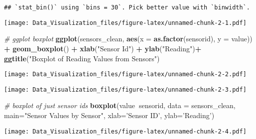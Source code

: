 \documentclass[]{article}
\newenvironment{Shaded}{\begin{snugshade}}{\end{snugshade}}
\newcommand{\CommentTok}[1]{\textcolor[rgb]{0.56,0.35,0.01}{\textit{#1}}}
\newcommand{\DataTypeTok}[1]{\textcolor[rgb]{0.13,0.29,0.53}{#1}}
\newcommand{\KeywordTok}[1]{\textcolor[rgb]{0.13,0.29,0.53}{\textbf{#1}}}
\newcommand{\NormalTok}[1]{#1}
\newcommand{\OperatorTok}[1]{\textcolor[rgb]{0.81,0.36,0.00}{\textbf{#1}}}
\newcommand{\StringTok}[1]{\textcolor[rgb]{0.31,0.60,0.02}{#1}}
\begin{document}
\begin{verbatim}
## `stat_bin()` using `bins = 30`. Pick better value with `binwidth`.
\end{verbatim}

\texttt{[image: Data\_Visualization\_files/figure-latex/unnamed-chunk-2-1.pdf]}

\begin{Shaded}
\begin{Highlighting}[]
\CommentTok{# ggplot boxplot}
\KeywordTok{ggplot}\NormalTok{(sensors_clean, }\KeywordTok{aes}\NormalTok{(}\DataTypeTok{x =} \KeywordTok{as.factor}\NormalTok{(sensorid), }\DataTypeTok{y =}\NormalTok{ value)) }\OperatorTok{+}\StringTok{ }\KeywordTok{geom_boxplot}\NormalTok{() }\OperatorTok{+}
\StringTok{  }\KeywordTok{xlab}\NormalTok{(}\StringTok{"Sensor Id"}\NormalTok{) }\OperatorTok{+}\StringTok{ }\KeywordTok{ylab}\NormalTok{(}\StringTok{"Reading"}\NormalTok{)}\OperatorTok{+}\StringTok{ }\KeywordTok{ggtitle}\NormalTok{(}\StringTok{"Boxplot of Reading Values from Sensors"}\NormalTok{)}
\end{Highlighting}
\end{Shaded}

\texttt{[image: Data\_Visualization\_files/figure-latex/unnamed-chunk-2-2.pdf]}

\begin{Shaded}
\end{Shaded}

\texttt{[image: Data\_Visualization\_files/figure-latex/unnamed-chunk-2-3.pdf]}

\begin{Shaded}
\begin{Highlighting}[]
\CommentTok{# boxplot of just sensor ids}
\KeywordTok{boxplot}\NormalTok{(value}\OperatorTok{~}\NormalTok{sensorid, }\DataTypeTok{data =}\NormalTok{ sensors_clean, }\DataTypeTok{main=}\StringTok{"Sensor Values by Sensor"}\NormalTok{, }\DataTypeTok{xlab=}\StringTok{'Sensor ID'}\NormalTok{, }\DataTypeTok{ylab=}\StringTok{'Reading'}\NormalTok{)}
\end{Highlighting}
\end{Shaded}

\texttt{[image: Data\_Visualization\_files/figure-latex/unnamed-chunk-2-4.pdf]}
\end{document}
